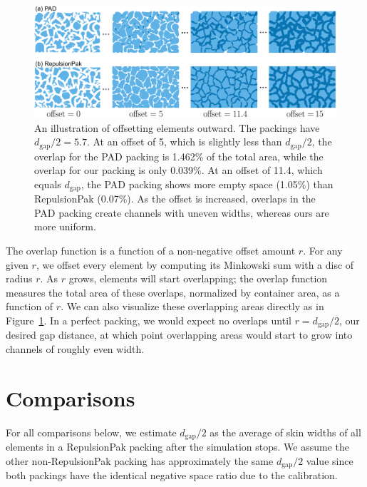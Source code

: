\begin{figure}
\centering
\includegraphics[width=1.0\textwidth]{figures/metrics/overlap_metric.pdf}
\caption[An illustration of offsetting elements outward]
{\label{fig_overlap_function}
    An illustration of offsetting elements outward. The packings have $d_\mathrm{gap} / 2 = 5.7$.  
    At an offset of 5, which is slightly less than $d_\mathrm{gap} / 2$,
    the overlap for the PAD packing is 1.462\% of the total area, while the overlap for our packing is only 0.039\%.
    At an offset of 11.4, which equals $d_\mathrm{gap}$, the PAD packing shows more empty space (1.05\%) than RepulsionPak (0.07\%).
    As the offset is increased, overlaps in the PAD packing create channels
  with uneven widths, whereas ours are more uniform.
  }
\end{figure}

The overlap function is a function of a non-negative offset amount
$r$.  For any given $r$, we offset every element by computing its Minkowski
sum with a disc of radius $r$.  As $r$ grows, elements will start overlapping;
the overlap function measures the total area of these overlaps, normalized
by container area, as a function of $r$.  We can also visualize these 
overlapping areas directly as in Figure~\ref{fig_overlap_function}.  In a 
perfect packing, we would expect no overlaps until $r=d_\mathrm{gap}/2$,
our desired gap distance, at which point overlapping areas would start to
grow into channels of roughly even width.



\section{Comparisons}

\newtext
{
	For all comparisons below, 
	we estimate $d_\mathrm{gap}/2$ as the average of skin widths of all elements 
	in a RepulsionPak packing after the simulation stops.
	We assume the other non-RepulsionPak packing has approximately the same $d_\mathrm{gap}/2$ value 
	since both packings have the identical negative space ratio due to the calibration.
}

